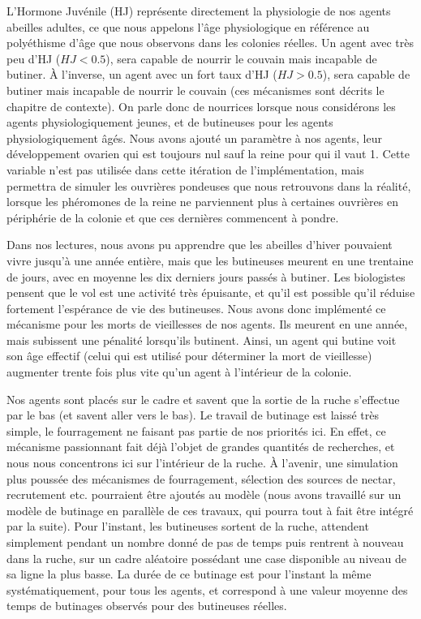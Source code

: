 		L'Hormone Juvénile (HJ) représente directement la physiologie de nos agents abeilles adultes, ce que nous appelons l'âge physiologique en référence au polyéthisme d'âge que nous observons dans les colonies réelles. Un agent avec très peu d'HJ ($HJ < 0.5$), sera capable de nourrir le couvain mais incapable de butiner. À l'inverse, un agent avec un fort taux d'HJ ($HJ > 0.5$), sera capable de butiner mais incapable de nourrir le couvain (ces mécanismes sont décrits le chapitre de contexte). On parle donc de nourrices lorsque nous considérons les agents physiologiquement jeunes, et de butineuses pour les agents physiologiquement âgés. Nous avons ajouté un paramètre à nos agents, leur développement ovarien qui est toujours nul sauf la reine pour qui il vaut 1. Cette variable n'est pas utilisée dans cette itération de l'implémentation, mais permettra de simuler les ouvrières pondeuses que nous retrouvons dans la réalité, lorsque les phéromones de la reine ne parviennent plus à certaines ouvrières en périphérie de la colonie et que ces dernières commencent à pondre.
		
		Dans nos lectures, nous avons pu apprendre que les abeilles d'hiver pouvaient vivre jusqu'à une année entière, mais que les butineuses meurent en une trentaine de jours, avec en moyenne les dix derniers jours passés à butiner. Les biologistes pensent que le vol est une activité très épuisante, et qu'il est possible qu'il réduise fortement l'espérance de vie des butineuses. Nous avons donc implémenté ce mécanisme pour les morts de vieillesses de nos agents. Ils meurent en une année, mais subissent une pénalité lorsqu'ils butinent. Ainsi, un agent qui butine voit son âge effectif (celui qui est utilisé pour déterminer la mort de vieillesse) augmenter trente fois plus vite qu'un agent à l'intérieur de la colonie.
		
		Nos agents sont placés sur le cadre et savent que la sortie de la ruche s'effectue par le bas (et savent aller vers le bas). Le travail de butinage est laissé très simple, le fourragement ne faisant pas partie de nos priorités ici. En effet, ce mécanisme passionnant fait déjà l'objet de grandes quantités de recherches, et nous nous concentrons ici sur l'intérieur de la ruche. À l'avenir, une simulation plus poussée des mécanismes de fourragement, sélection des sources de nectar, recrutement etc. pourraient être ajoutés au modèle (nous avons travaillé sur un modèle de butinage \cite{riviere_modemulti-agent_2021} en parallèle de ces travaux, qui pourra tout à fait être intégré par la suite). Pour l'instant, les butineuses sortent de la ruche, attendent simplement pendant un nombre donné de pas de temps puis rentrent à nouveau dans la ruche, sur un cadre aléatoire possédant une case disponible au niveau de sa ligne la plus basse. La durée de ce butinage est pour l'instant la même systématiquement, pour tous les agents, et correspond à une valeur moyenne des temps de butinages observés pour des butineuses réelles.
		
